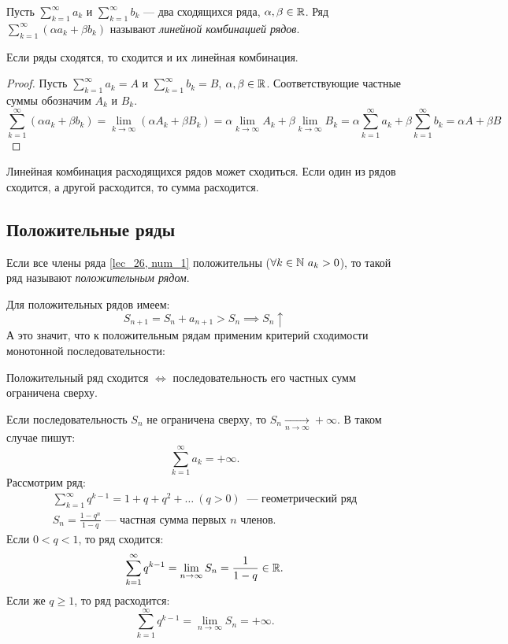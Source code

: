 \documentclass[../../main.tex]{subfiles}
\begin{document}
Пусть $\sum\limits_{k = 1}^\infty a_k$  и $\sum\limits_{k = 1}^\infty b_k$
 --- два сходящихся ряда, $\alpha, \beta \in \mathbb{R}$.
Ряд $\sum\limits_{k = 1}^\infty(\alpha a_k + \beta b_k)$
 называют \emph{линейной комбинацией рядов}. 
\begin{thm}
Если ряды сходятся, то сходится и их линейная комбинация.
 \end{thm}
\begin{proof}
	Пусть  $\sum\limits_{k = 1}^\infty a_k = A$  
	и $\sum\limits_{k = 1}^\infty b_k = B$, \enspace
	 $\alpha, \beta \in \mathbb{R}$. Соответствующие частные суммы обозначим $A_k$ и $B_k$.
 	\[
 		\sum\limits_{k = 1}^\infty(\alpha a_k + \beta b_k) =
 		\lim\limits_{k \to \infty} (\alpha A_k + \beta B_k) =
 		\alpha\lim\limits_{k \to \infty} A_k +
 		\beta\lim\limits_{k \to \infty} B_k =
 		\alpha\sum\limits_{k = 1}^\infty a_k + 
 		\beta\sum\limits_{k = 1}^\infty b_k = \alpha A + 
 		\beta B
 	\]
 \end{proof}
 Линейная комбинация расходящихся рядов может сходиться.
 Если один из рядов сходится, а другой расходится, то 
 сумма расходится.
 \subsection{Положительные ряды}
\begin{definition}
Если все члены ряда \eqref{lec_26, num_1} положительны
($\forall k \in \N \ a_k > 0$),
то такой ряд называют \emph{положительным рядом}.
\end{definition}
Для положительных рядов имеем:
\[
	S_{n+1} = S_n + a_{n+1}  > S_n \implies S_n \uparrow
\]
А это значит, что к положительным рядам применим 
критерий сходимости монотонной последовательности:
 \begin{thm} 
 	\label{lec26:pos_series}
 	 Положительный ряд сходится $\iff$ последовательность 
 	его частных сумм ограничена сверху.
 \end{thm}
 \begin{rem}
 	 Если  последовательность $S_n$ не ограничена сверху, 
 	 то  $S_n\xrightarrow[n \to \infty]{}+\infty$. В таком случае пишут:
 	 \[
 		\sum\limits_{k = 1}^\infty a_k= +\infty
	.\]
	Рассмотрим ряд:
	 \begin{gather*}
 		\sum\limits_{k = 1}^\infty q^{k-1}=  1 + q + q^2 + \ldots
 		\ (q > 0)\ \text{ --- геометрический ряд}\\
 		S_n = \frac{1 - q^n}{1 - q} \text{ --- частная сумма первых $n$ членов}
	.\end{gather*}
	Если $0 < q < 1$, то ряд сходится:
	\[
	\sum\limits_{k = 1}^\infty q^{k-1} = \lim\limits_{n \to \infty} S_n =
	\frac{1}{1 - q} \in \mathbb{R}
	.\]
	Если же $q \geq 1$, то ряд расходится:
	\[
	\sum\limits_{k = 1}^\infty q^{k-1} = \lim\limits_{n \to \infty} S_n =
	+ \infty
	.\]
 \end{rem}
\end{document}
